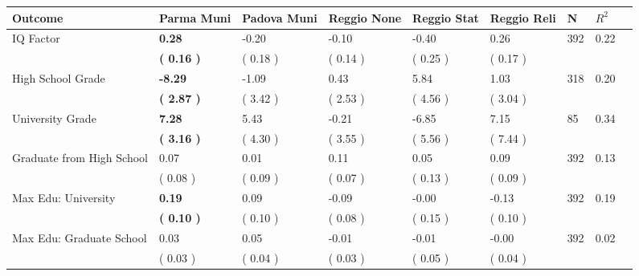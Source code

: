 \begin{tabular}{L{6.2cm} C{1.8cm} C{1.8cm} C{1.8cm} C{1.8cm} C{1.8cm} C{1.8cm} C{0.3cm} C{0.3cm}}
\toprule
 \textbf{Outcome} & \textbf{Parma Muni} & \textbf{Padova Muni} & \textbf{Reggio None} & \textbf{Reggio Stat} & \textbf{Reggio Reli} & \textbf{N} & \textbf{$ R^2$} \\
\midrule
IQ Factor & \textbf{     0.28} &     -0.20 &     -0.10 &     -0.40 &      0.26  & 392 &       0.22 \\ 
 & \textbf{(     0.16 )} & (     0.18 ) & (     0.14 ) & (     0.25 ) & (     0.17 )  & \\
High School Grade & \textbf{    -8.29} &     -1.09 &      0.43 &      5.84 &      1.03  & 318 &       0.20 \\ 
 & \textbf{(     2.87 )} & (     3.42 ) & (     2.53 ) & (     4.56 ) & (     3.04 )  & \\
University Grade & \textbf{     7.28} &      5.43 &     -0.21 &     -6.85 &      7.15  & 85 &       0.34 \\ 
 & \textbf{(     3.16 )} & (     4.30 ) & (     3.55 ) & (     5.56 ) & (     7.44 )  & \\
Graduate from High School &      0.07 &      0.01 &      0.11 &      0.05 &      0.09  & 392 &       0.13 \\ 
 & (     0.08 ) & (     0.09 ) & (     0.07 ) & (     0.13 ) & (     0.09 )  & \\
Max Edu: University & \textbf{     0.19} &      0.09 &     -0.09 &     -0.00 &     -0.13  & 392 &       0.19 \\ 
 & \textbf{(     0.10 )} & (     0.10 ) & (     0.08 ) & (     0.15 ) & (     0.10 )  & \\
Max Edu: Graduate School &      0.03 &      0.05 &     -0.01 &     -0.01 &     -0.00  & 392 &       0.02 \\ 
 & (     0.03 ) & (     0.04 ) & (     0.03 ) & (     0.05 ) & (     0.04 )  & \\
\bottomrule
\end{tabular}
